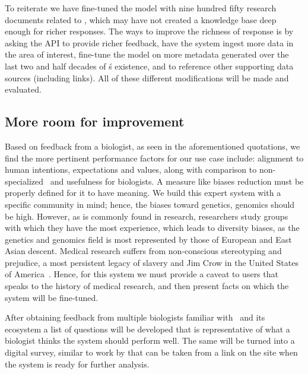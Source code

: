 To reiterate we have fine-tuned the model with nine hundred fifty research documents related to \GN, which may have not created a knowledge base deep enough for richer responses.
The ways to improve the richness of response is by asking the API to provide richer feedback, have the system ingest more data in the area of interest, fine-tune the model on more metadata generated over the last two and half decades of \GN\'s existence, and to reference other supporting data sources (including links).
All of these different modifications will be made and evaluated.


\subsection{More room for improvement}
Based on feedback from a biologist, as seen in the aforementioned quotations, we find the more pertinent performance factors for our use case include: alignment to human intentions, expectations and values, along with comparison to non-specialized \llms\, and usefulness for biologists.
A measure like biases reduction must be properly defined for it to have meaning.
We build this expert system with a specific community in mind; hence, the biases toward genetics, genomics should be high.
However, as is commonly found in research, researchers study groups with which they have the most experience, which leads to diversity biases, as the genetics and genomics field is most represented by those of European and East Asian descent.
Medical research suffers from non-conscious stereotyping and prejudice, a most persistent legacy of slavery and Jim Crow in the United States of America~\cite{Stone:2011}.
Hence, for this system we must provide a caveat to users that speaks to the history of medical research, and then present facts on which the system will be fine-tuned.
    

After obtaining feedback from multiple biologists familiar with \GN\ and its ecosystem a list of questions will be developed that is representative of what a biologist thinks the system should perform well. 
The same will be turned into a digital survey, similar to work by \cite{Blattgerste:2022} that can be taken from a link on the site when the system is ready for further analysis.


